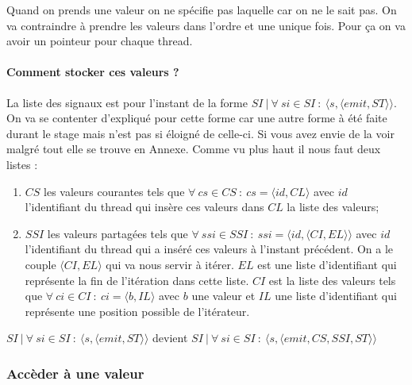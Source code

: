 \documentclass[10pt,a4paper]{article}
\begin{document}
				Quand on prends une valeur on ne spécifie pas laquelle car on ne le sait pas. On va contraindre à prendre les valeurs dans l'ordre et une unique fois. Pour ça on va avoir un pointeur pour chaque thread. 
				
				\paragraph{Comment stocker ces valeurs ?} 
				La liste des signaux est pour l'instant de la forme $SI~|~\forall~si \in SI~:~\langle s,\langle emit,ST \rangle\rangle$. On va se contenter d'expliqué pour cette forme car une autre forme à été faite durant le stage mais n'est pas si éloigné de celle-ci. Si vous avez envie de la voir malgré tout elle se trouve en Annexe. Comme vu plus haut il nous faut deux listes : 
				\smallbreak
				\begin{enumerate}
					\item $CS$ les valeurs courantes tels que $\forall~cs \in CS~:~cs = \langle id , CL \rangle$ avec $id$ l'identifiant du thread qui insère ces valeurs dans $CL$ la liste des valeurs;
					\item $SSI$ les valeurs partagées tels que $\forall~ssi \in SSI~:~ssi = \langle id,\langle CI,EL\rangle\rangle$ avec $id$ l'identifiant du thread qui a inséré ces valeurs à l'instant précédent. On a le couple $\langle CI,EL\rangle$ qui va nous servir à itérer. $EL$ est une liste d'identifiant qui représente la fin de l'itération dans cette liste. $CI$ est la liste des valeurs tels que $\forall~ci \in CI~:~ci = \langle b,IL\rangle$ avec $b$ une valeur et $IL$ une liste d'identifiant qui représente une position possible de l'itérateur.
				\end{enumerate}
				\medbreak
				
				$SI~|~\forall~si \in SI~:~\langle s,\langle emit,ST \rangle\rangle$ devient $SI~|~\forall~si \in SI~:~\langle s,\langle emit,CS,SSI,ST \rangle\rangle$
				\bigbreak
				
				
			\subsubsection{Accèder à une valeur}
				
\end{document}
